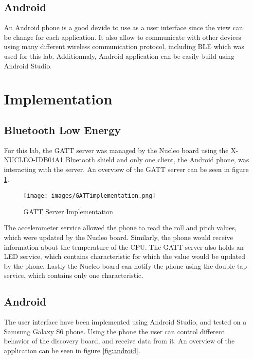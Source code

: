\documentclass[12pt]{article}
\begin{document}
\subsection{Android}
An Android phone is a good devide to use as a user interface since the view can be change for each application. It also allow to communicate with other devices using many different wireless communication protocol, including BLE which was used for this lab. Additionnaly, Android application can be easily build using Android Studio.

\section{Implementation}
\subsection{Bluetooth Low Energy}
For this lab, the GATT server was managed by the Nucleo board using the X-NUCLEO-IDB04A1 Bluetooth shield and only one client, the Android phone, was interacting with the server. An overview of the GATT server can be seen in figure \ref{fig:gattimp}.

\begin{figure}[!htb]
 \centering
 \texttt{[image: images/GATTimplementation.png]}
 \caption{GATT Server Implementation}
 \label{fig:gattimp}
\end{figure}

The accelerometer service allowed the phone to read the roll and pitch values, which were updated by the Nucleo board. Similarly, the phone would receive information about the temperature of the CPU. The GATT server also holds an LED service, which contains characteristic for which the value would be updated by the phone. Lastly the Nucleo board can notify the phone using the double tap service, which contains only one characteristic.

\subsection{Android}
The user interface have been implemented using Android Studio, and tested on a Samsung Galaxy S6 phone. Using the phone the user can control different behavior of the discovery board, and receive data from it. An overview of the application can be seen in figure \ref{fig:android}.
\end{document}
